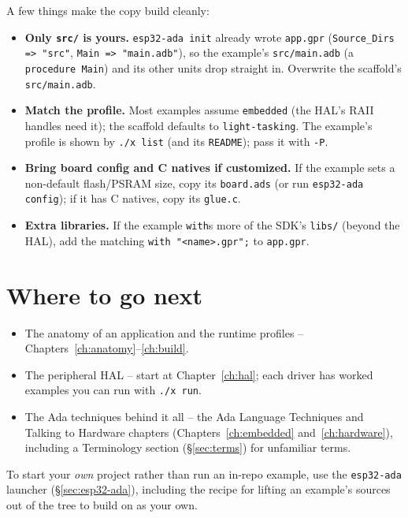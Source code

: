 A few things make the copy build cleanly:

\begin{itemize}
\item \textbf{Only \texttt{src/} is yours.} \texttt{esp32-ada init} already wrote
  \texttt{app.gpr} (\texttt{Source\_Dirs => "src"}, \texttt{Main => "main.adb"}),
  so the example's \texttt{src/main.adb} (a \texttt{procedure Main}) and its other
  units drop straight in. Overwrite the scaffold's \texttt{src/main.adb}.
\item \textbf{Match the profile.} Most examples assume \texttt{embedded} (the HAL's
  RAII handles need it); the scaffold defaults to \texttt{light-tasking}. The
  example's profile is shown by \texttt{./x list} (and its \texttt{README}); pass
  it with \texttt{-P}.
\item \textbf{Bring board config and C natives if customized.} If the example sets
  a non-default flash/PSRAM size, copy its \texttt{board.ads} (or run
  \texttt{esp32-ada config}); if it has C natives, copy its \texttt{glue.c}.
\item \textbf{Extra libraries.} If the example \texttt{with}s more of the SDK's
  \texttt{libs/} (beyond the HAL), add the matching \texttt{with "<name>.gpr";} to
  \texttt{app.gpr}.
\end{itemize}


\section{Where to go next}

\begin{itemize}
\item The anatomy of an application and the runtime profiles --
  Chapters~\ref{ch:anatomy}--\ref{ch:build}.
\item The peripheral HAL -- start at Chapter~\ref{ch:hal}; each driver has worked
  examples you can run with \texttt{./x run}.
\item The Ada techniques behind it all -- the Ada Language Techniques and
  Talking to Hardware chapters (Chapters~\ref{ch:embedded}
  and~\ref{ch:hardware}), including a Terminology section (\S\ref{sec:terms})
  for unfamiliar terms.
\end{itemize}

To start your \emph{own} project rather than run an in-repo example, use the
\texttt{esp32-ada} launcher (\S\ref{sec:esp32-ada}), including the recipe for
lifting an example's sources out of the tree to build on as your own.
